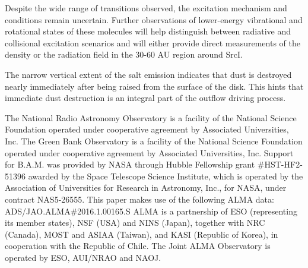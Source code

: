 \documentclass[twocolumn]{aastex62}
\newcommand{\sourcei}{SrcI\xspace}
\begin{document}
Despite the wide range of transitions observed, the excitation mechanism and
conditions remain uncertain.  Further observations of lower-energy vibrational
and rotational states of these molecules will help distinguish between
radiative and collisional excitation scenarios and will either provide
direct measurements of the density or the radiation field in the 30-60 AU
region around \sourcei.

The narrow vertical extent of the salt emission indicates that dust is
destroyed nearly immediately after being raised from the surface of the disk.
This hints that immediate dust destruction is an integral part of the outflow
driving process.



\acknowledgements
The National Radio Astronomy Observatory is a facility of the National Science
Foundation operated under cooperative agreement by Associated Universities,
Inc. The Green Bank Observatory is a facility of the National Science
Foundation operated under cooperative agreement by Associated Universities,
Inc. Support for B.A.M. was provided by NASA through Hubble Fellowship grant
\#HST-HF2-51396 awarded by the Space Telescope Science Institute, which is
operated by the Association of Universities for Research in Astronomy, Inc.,
for NASA, under contract NAS5-26555. 
This paper makes use of the following ALMA data: ADS/JAO.ALMA\#2016.1.00165.S
ALMA is a partnership of ESO (representing its member states), NSF (USA) and
NINS (Japan), together with NRC (Canada), MOST and ASIAA (Taiwan), and KASI
(Republic of Korea), in cooperation with the Republic of Chile. The Joint ALMA
Observatory is operated by ESO, AUI/NRAO and NAOJ.




\end{document}
